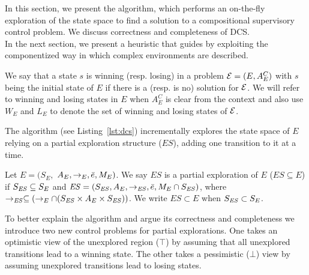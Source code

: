 In this section, we present the \DCS algorithm, which performs an 
on-the-fly 
exploration of the state space to find a solution to a compositional 
supervisory 
control problem. We discuss correctness and completeness of 
DCS.\\
In the next section, we present a heuristic that guides \DCS by 
exploiting the 
componentized way in which complex environments are described.





\begin{notation}
We say that a state $s$ is winning (resp. losing) in a problem $\mathcal{E} = 
(E, A_E^C)$ 
with $s$ being the initial state of $E$ if there is a (resp. is no) 
solution for $\mathcal{E}$. We 
will refer to winning and losing states in $E$ when $A_E^C$ is clear 
from the context 
and also use $W_E$ and $L_E$ to denote the set of winning and 
losing states of $\mathcal{E}$.
\end{notation}


The algorithm (see Listing~\ref{lst:dcs}) incrementally explores the 
state space of  
$E$ relying on a partial exploration structure ($ES$), adding one 
transition to it at a 
time. 


\begin{definition}
 \label{def:unexploredTo}

Let $E = (S_E,$ $A_E, \rightarrow_E, \bar{e}, M_E)$. We say $ES$ is a partial 
exploration of $E$ ($ES \subseteq E$) if $S_{\mathit{ES}} \subseteq 
S_E$ and $\mathit{ES} = (S_{\mathit{ES}},A_E, \rightarrow_{\mathit{ES}},\bar{e},M_E 
\cap S_{\mathit{ES}})$, where $ \rightarrow_{\mathit{ES}} \subseteq (\rightarrow_E \cap 
(S_{\mathit{ES}} \times A_E \times S_{\mathit{ES}}))$.
We write $ES \subset E$ when $S_{\mathit{ES}} \subset S_E$.
\end{definition}

To better explain the algorithm and argue its correctness and 
completeness we 
introduce two new control problems for partial explorations. One 
takes an 
optimistic view of the unexplored region ($\top$) by assuming that 
all unexplored 
transitions lead to a winning state. The other takes a pessimistic 
($\bot$) 
view by assuming unexplored transitions lead to losing states. 

